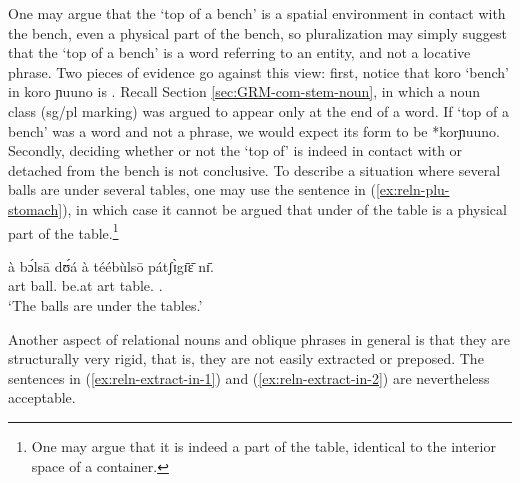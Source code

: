 \begin{exe}
\begin{exe}
\begin{exe}
\begin{exe}
\begin{exe}
\begin{exe}
\begin{exe}
\begin{exe}
One may argue that the `top of a bench' is a spatial environment  in contact with the bench, even a physical part of the bench, so pluralization may simply suggest that the   `top of a bench' is a word referring to an entity,  and not a locative phrase. Two pieces of evidence go against this view: first,  notice that {\sls koro} `bench'  in {\sls koro ɲuuno} is .  Recall Section \ref{sec:GRM-com-stem-noun},  in which a noun class ({\sc sg/pl} marking) was argued to  appear only at the end of a word. If  `top of a bench' was a word and not a phrase, we would expect its  form to be  *{\sls korɲuuno}. Secondly, deciding whether or not the `top of' is indeed in contact with or detached from the bench is not conclusive. To describe a situation where several balls are under several tables, one may use the sentence in (\ref{ex:reln-plu-stomach}), in which case it cannot be argued that  under of the table is a physical part of the table.\footnote{One may argue that it is indeed a part of the table, identical to the interior space of a container.}

\ea\label{ex:reln-plu-stomach}
\gll à bɔ́lsā dʊ́á à téébùlsō pátʃɪ̀gɪ̄ɛ̄ nɪ̄.\\
{\sc art} ball.{\pl}  be.at {\sc art}   table.{\pl}  {\reln .\pl} {\postp}\\
\glt `The balls are under the tables.'
\z




Another aspect of relational nouns and oblique phrases in general is that they are structurally very rigid, that is, they are not easily extracted or preposed. The sentences in  (\ref{ex:reln-extract-in-1}) and  (\ref{ex:reln-extract-in-2})  are nevertheless acceptable. 

\ea\label{ex:reln-extract}


\end{exe}
\end{exe}
\end{exe}
\end{exe}
\end{exe}
\end{exe}
\end{exe}
\end{exe}
